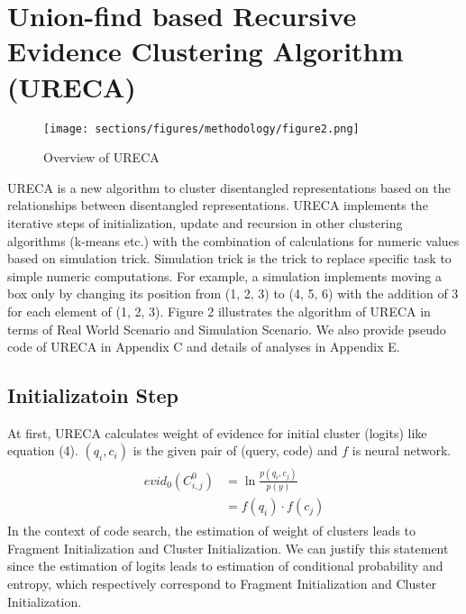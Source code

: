 \section{Union-find based Recursive Evidence Clustering Algorithm (URECA)}

\begin{figure*}[t]
\centering
\texttt{[image: sections/figures/methodology/figure2.png]} 
\caption{
Overview of URECA
}
\label{fig2}
\end{figure*}

URECA is a new algorithm to cluster disentangled representations based on the relationships between disentangled representations.
URECA implements the iterative steps of initialization, update and recursion in other clustering algorithms (k-means etc.) 
with the combination of calculations for numeric values based on simulation trick. 
Simulation trick is the trick to replace specific task to simple numeric computations. 
For example, a simulation implements moving a box only by changing its position 
from (1, 2, 3) to (4, 5, 6) with the addition of 3 for each element of (1, 2, 3).
Figure 2 illustrates the algorithm of URECA in terms of Real World Scenario and Simulation Scenario.  
We also provide pseudo code of URECA in Appendix C and details of analyses in Appendix E.


\subsection{Initializatoin Step}
At first, URECA calculates weight of evidence for initial cluster (logits) like equation (4).
$(q_i,c_i)$ is the given pair of (query, code) and $f$ is neural network.
\begin{align}
\label{initial_evidence_cluster}
\begin{split}
    evid_0(C^0_{i,j})&=\ln{ \frac{p(q_i,c_j)}{p(y)}}\\
                     &= f(q_i) \cdot f(c_j)
\end{split}
\end{align}
In the context of code search, the estimation of weight of clusters leads to Fragment Initialization and Cluster Initialization.
We can justify this statement since the estimation of logits leads to estimation of conditional probability and entropy, 
which respectively correspond to Fragment Initialization and Cluster Initialization.

